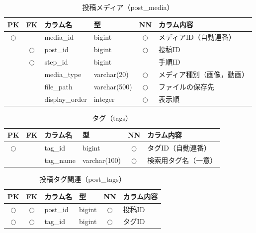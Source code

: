 \begin{table}[H]
    \centering
    \caption{投稿メディア（post\_media）}
    \label{tab:db_post_media}
    \small
    \begin{tabularx}{\textwidth}{|c|c|l|l|c|X|}
        \hline
        PK & FK & カラム名 & 型 & NN & カラム内容 \\ \hline
        $\bigcirc$ & & media\_id & bigint & $\bigcirc$ & メディアID（自動連番） \\ \hline
        & $\bigcirc$ & post\_id & bigint & $\bigcirc$ & 投稿ID \\ \hline
        & $\bigcirc$ & step\_id & bigint & & 手順ID \\ \hline
        & & media\_type & varchar(20) & $\bigcirc$ & メディア種別（画像，動画） \\ \hline
        & & file\_path & varchar(500) & $\bigcirc$ & ファイルの保存先 \\ \hline
        & & display\_order & integer & $\bigcirc$ & 表示順 \\ \hline
    \end{tabularx}
\end{table}



\begin{table}[H]
    \centering
    \caption{タグ（tags）}
    \label{tab:db_tags}
    \small
    \begin{tabularx}{\textwidth}{|c|c|l|l|c|X|}
        \hline
        PK & FK & カラム名 & 型 & NN & カラム内容 \\ \hline
        $\bigcirc$ & & tag\_id & bigint & $\bigcirc$ & タグID（自動連番） \\ \hline
        & & tag\_name & varchar(100) & $\bigcirc$ & 検索用タグ名（一意） \\ \hline
    \end{tabularx}
\end{table}



\begin{table}[H]
    \centering
    \caption{投稿タグ関連（post\_tags）}
    \label{tab:db_post_tags}
    \small
    \begin{tabularx}{\textwidth}{|c|c|l|l|c|X|}
        \hline
        PK & FK & カラム名 & 型 & NN & カラム内容 \\ \hline
        $\bigcirc$ & $\bigcirc$ & post\_id & bigint & $\bigcirc$ & 投稿ID \\ \hline
        $\bigcirc$ & $\bigcirc$ & tag\_id & bigint & $\bigcirc$ & タグID \\ \hline
    \end{tabularx}
\end{table}



